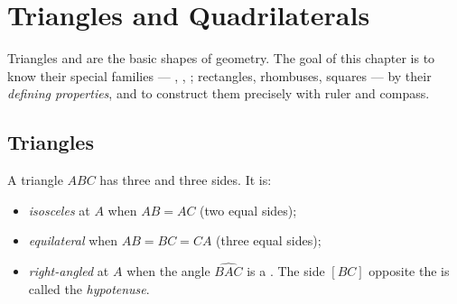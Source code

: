 \chapter{Triangles and Quadrilaterals}\label{ch:g6:shapes}

Triangles and  are the basic shapes of geometry. The goal
of this chapter is to know their special families --- ,
, ; rectangles, rhombuses, squares --- by
their \emph{defining properties}, and to construct them precisely with
ruler and compass.

\section{Triangles}

\begin{definition}\label{def:g6:shapes:triangles}
A triangle $ABC$ has three  and three sides. It is:
\begin{itemize}
  \item \emph{isosceles} at $A$ when
        $AB = AC$ (two equal sides);
  \item \emph{equilateral} when
        $AB = BC = CA$ (three equal sides);
  \item \emph{right-angled} at $A$ when the angle
        $\widehat{BAC}$ is a . The side $[BC]$ opposite the
         is called the \emph{hypotenuse}.
\end{itemize}
\end{definition}

